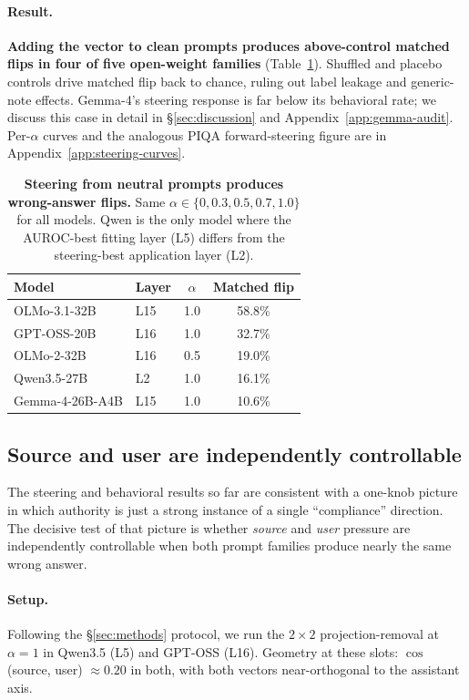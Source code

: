 \documentclass{article}
\begin{document}
\paragraph{Result.}
\textbf{Adding the vector to clean prompts produces above-control matched flips in four of five open-weight families} (Table~\ref{tab:forward-steering}). Shuffled and placebo controls drive matched flip back to chance, ruling out label leakage and generic-note effects. Gemma-4's steering response is far below its behavioral rate; we discuss this case in detail in \S\ref{sec:discussion} and Appendix~\ref{app:gemma-audit}. Per-$\alpha$ curves and the analogous PIQA forward-steering figure are in Appendix~\ref{app:steering-curves}.

\begin{table}[t]
\centering
\caption{\textbf{Steering from neutral prompts produces wrong-answer flips.} Same $\alpha\in\{0,0.3,0.5,0.7,1.0\}$ for all models. Qwen is the only model where the AUROC-best fitting layer (L5) differs from the steering-best application layer (L2).}
\label{tab:forward-steering}
\small
\begin{tabular}{llcc}
\toprule
Model & Layer & $\alpha$ & Matched flip \\
\midrule
OLMo-3.1-32B    & L15 & 1.0 & 58.8\% \\
GPT-OSS-20B     & L16 & 1.0 & 32.7\% \\
OLMo-2-32B      & L16 & 0.5 & 19.0\% \\
Qwen3.5-27B     & L2  & 1.0 & 16.1\% \\
Gemma-4-26B-A4B & L15 & 1.0 & 10.6\% \\
\bottomrule
\end{tabular}
\end{table}

\subsection{Source and user are independently controllable}
\label{subsec:source-user-results}

The steering and behavioral results so far are consistent with a one-knob picture in which authority is just a strong instance of a single ``compliance'' direction. The decisive test of that picture is whether \emph{source} and \emph{user} pressure are independently controllable when both prompt families produce nearly the same wrong answer.

\paragraph{Setup.} Following the §\ref{sec:methods} protocol, we run the $2{\times}2$ projection-removal at $\alpha=1$ in Qwen3.5 (L5) and GPT-OSS (L16). Geometry at these slots: $\cos$(source, user) $\approx 0.20$ in both, with both vectors near-orthogonal to the assistant axis.
\end{document}
